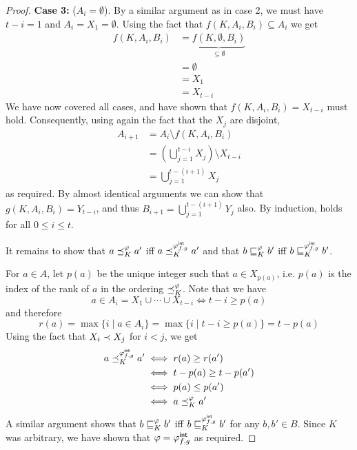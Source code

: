 \begin{proof}
    \textbf{Case 3:} ($A_i = \emptyset$). By a similar argument as in case 2,
    we must have $t - i = 1$ and $A_i = X_1 = \emptyset$. Using the fact that
    $f(K, A_i, B_i) \subseteq A_i$ we get
    \begin{align*}
        f(K, A_i, B_i)
        &= \underbrace{f(K, \emptyset, B_i)}_{\subseteq \emptyset} \\
        &= \emptyset \\
        &= X_1 \\
        &= X_{t-i}
    \end{align*}
    We have now covered all cases, and have shown that $f(K, A_i, B_i) =
    X_{t-i}$ must hold. Consequently, using again the fact that the $X_j$ are
    disjoint,
    \begin{align*}
        A_{i+1}
        &= A_i \setminus f(K, A_i, B_i) \\
        &= \left(\bigcup_{j=1}^{t-i}{X_j}\right) \setminus X_{t-i} \\
        &= \bigcup_{j=1}^{t-(i+1)}{X_j}
    \end{align*}
    as required. By almost identical arguments we can show that $g(K, A_i, B_i)
    = Y_{t-i}$, and thus $B_{i+1} = \bigcup_{j=1}^{t-(i+1)}{Y_j}$ also. By
    induction,  holds for all $0 \le i \le t$.

    It remains to show that $a \preceq_K^\varphi a'$ iff $a \preceq_K^{{\varphi_{f,g}^\mathsf{int}}} a'$
    and that $b \sqsubseteq_K^\varphi b'$ iff $b \sqsubseteq_K^{{\varphi_{f,g}^\mathsf{int}}} b'$.

    For $a \in A$, let $p(a)$ be the unique integer such that $a \in X_{p(a)}$,
    i.e. $p(a)$ is the index of the rank of $a$ in the ordering
    ${\preceq_K^\varphi}$. Note that we have
    \[
        a \in A_i = X_1 \cup \cdots \cup X_{t-i}
        \iff
        t - i \ge p(a)
    \]
    and therefore
    \[
        r(a)
        = \max\{i \mid a \in A_i\}
        = \max\{i \mid t - i \ge p(a)\}
        = t - p(a)
    \]
    Using the fact that $X_i \prec X_j$ for $i < j$, we get
    \begin{align*}
        a \preceq_K^{{\varphi_{f,g}^\mathsf{int}}} a'
        &\iff r(a) \ge r(a') \\
        &\iff t - p(a) \ge t - p(a') \\
        &\iff p(a) \le p(a') \\
        &\iff a \preceq_K^\varphi a'
    \end{align*}
    A similar argument shows that $b \sqsubseteq_K^\varphi b'$ iff $b
    \sqsubseteq_K^{{\varphi_{f,g}^\mathsf{int}}} b'$ for any $b, b' \in B$. Since $K$ was arbitrary, we
    have shown that $\varphi = {\varphi_{f,g}^\mathsf{int}}$ as required.
\end{proof}


